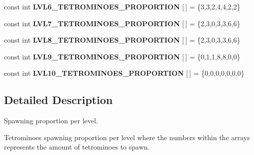 \begin{DoxyCompactItemize}
const int {\bfseries L\+V\+L6\+\_\+\+T\+E\+T\+R\+O\+M\+I\+N\+O\+E\+S\+\_\+\+P\+R\+O\+P\+O\+R\+T\+I\+ON} \mbox{[}$\,$\mbox{]} = \{3,3,2,4,4,2,2\}
\item 
\mbox{\label{group__proportionsGroup_ga9e982eb4293601dd5fabdc4145f66ef9}} 
const int {\bfseries L\+V\+L7\+\_\+\+T\+E\+T\+R\+O\+M\+I\+N\+O\+E\+S\+\_\+\+P\+R\+O\+P\+O\+R\+T\+I\+ON} \mbox{[}$\,$\mbox{]} = \{2,3,0,3,3,6,6\}
\item 
\mbox{\label{group__proportionsGroup_gae56d8e18eb7f830966686973ca23de04}} 
const int {\bfseries L\+V\+L8\+\_\+\+T\+E\+T\+R\+O\+M\+I\+N\+O\+E\+S\+\_\+\+P\+R\+O\+P\+O\+R\+T\+I\+ON} \mbox{[}$\,$\mbox{]} = \{2,3,0,3,3,6,6\}
\item 
\mbox{\label{group__proportionsGroup_ga75503d667fcb14d117b1d36a1217dcd3}} 
const int {\bfseries L\+V\+L9\+\_\+\+T\+E\+T\+R\+O\+M\+I\+N\+O\+E\+S\+\_\+\+P\+R\+O\+P\+O\+R\+T\+I\+ON} \mbox{[}$\,$\mbox{]} = \{0,1,1,8,8,0,0\}
\item 
\mbox{\label{group__proportionsGroup_gade2686c156665230a5ade2af1964ead4}} 
const int {\bfseries L\+V\+L10\+\_\+\+T\+E\+T\+R\+O\+M\+I\+N\+O\+E\+S\+\_\+\+P\+R\+O\+P\+O\+R\+T\+I\+ON} \mbox{[}$\,$\mbox{]} = \{0,0,0,0,0,0,0\}
\end{DoxyCompactItemize}


\subsection{Detailed Description}
Spawning proportion per level. 

Tetrominoes spawning proportion per level where the numbers within the arrays represents the amount of tetrominoes to spawn.

